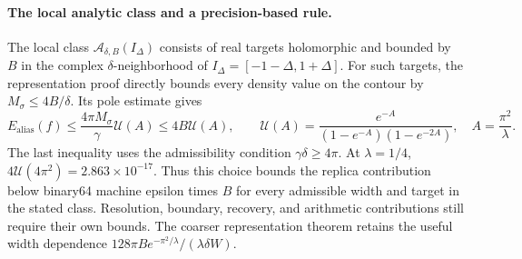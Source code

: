\documentclass[11pt]{article}
\begin{document}
\paragraph{The local analytic class and a precision-based rule.}
The local class $\mathcal A_{\delta,B}(I_\Delta)$ consists of real targets
holomorphic and bounded by $B$ in the complex $\delta$-neighborhood of
$I_\Delta=[-1-\Delta,1+\Delta]$. For such targets, the representation
proof directly bounds every density value on the contour by
$M_\sigma\le4B/\delta$. Its pole estimate gives
\begin{equation}
 E_{\mathrm{alias}}(f)
 \le\frac{4\pi M_\sigma}{\gamma}\mathcal U(A)
 \le4B\mathcal U(A),\qquad
 \mathcal U(A)=\frac{e^{-A}}{(1-e^{-A})(1-e^{-2A})},\quad
 A=\frac{\pi^2}{\lambda}.
 \label{eq:lambda-local-class-budget}
\end{equation}
The last inequality uses the admissibility condition $\gamma\delta\ge4\pi$.
At $\lambda=1/4$, $4\mathcal U(4\pi^2)=2.863\times10^{-17}$.
Thus this choice bounds the replica contribution below binary64 machine
epsilon times $B$ for every admissible width and target in the stated
class. Resolution, boundary, recovery, and arithmetic contributions still
require their own bounds. The coarser representation theorem retains
the useful width dependence
$128\pi B e^{-\pi^2/\lambda}/(\lambda\delta W)$.
\end{document}
